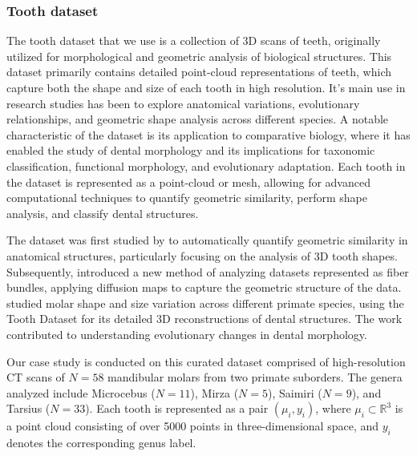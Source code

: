 \subsubsection{Tooth dataset}

The tooth dataset that we use is a collection of 3D scans of teeth, originally utilized for morphological and geometric analysis of biological structures. This dataset primarily contains detailed point-cloud representations of teeth, which capture both the shape and size of each tooth in high resolution. It's main use in research studies has been to explore anatomical variations, evolutionary relationships, and geometric shape analysis across different species. A notable characteristic of the dataset is its application to comparative biology, where it has enabled the study of dental morphology and its implications for taxonomic classification, functional morphology, and evolutionary adaptation. Each tooth in the dataset is represented as a point-cloud or mesh, allowing for advanced computational techniques to quantify geometric similarity, perform shape analysis, and classify dental structures.

The dataset was first studied by \cite{Boyer2011} to automatically quantify geometric similarity in anatomical structures, particularly focusing on the analysis of 3D tooth shapes. Subsequently, \cite{Gao2021} introduced a new method of analyzing datasets represented as fiber bundles, applying diffusion maps to capture the geometric structure of the data. \cite{StClair2016} studied molar shape and size variation across different primate species, using the Tooth Dataset for its detailed 3D reconstructions of dental structures. The work contributed to understanding evolutionary changes in dental morphology.

Our case study is conducted on this curated dataset comprised of high-resolution CT scans of $N = 58$ mandibular molars from two primate suborders. The genera analyzed include Microcebus ($N = 11$), Mirza ($N = 5$), Saimiri ($N = 9$), and Tarsius ($N = 33$). Each tooth is represented as a pair $(\mu_i, y_i)$, where $\mu_i \subset \mathbb{R}^3$ is a point cloud consisting of over 5000 points in three-dimensional space, and $y_i$ denotes the corresponding genus label.